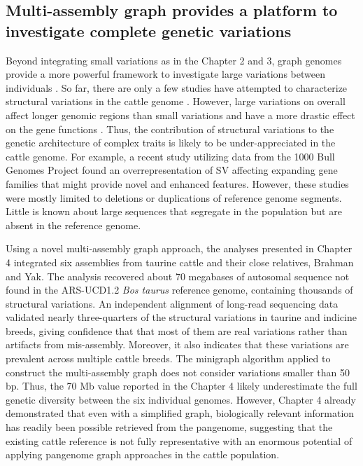 \documentclass[../main.tex]{subfiles}
\begin{document}
\subsection*{Multi-assembly graph provides a platform to investigate complete genetic variations }

Beyond integrating small variations as in the Chapter 2 and 3, graph genomes provide a more powerful framework to investigate large variations between individuals \citep{eggertsson2019graphtyper2,chen2019paragraph,siren2020genotyping}. So far, there are only a few studies have attempted to characterize structural variations in the cattle genome \citep{liu2010analysis,bickhart2012copy,boussaha2015genome,chen2017detection,Hu2020}. However, large variations on overall affect longer genomic regions than small variations and have a more drastic effect on the gene functions \citep{chiang2017impact,scott2021structural}. Thus, the contribution of structural variations to the genetic architecture of complex traits is likely to be under-appreciated in the cattle genome.
For example, a recent study utilizing data from the 1000 Bull Genomes Project \citep{chen2017detection} found an overrepresentation of SV affecting expanding gene families that might provide novel and enhanced features. However, these studies were mostly limited to deletions or duplications of reference genome segments. Little is known about large sequences that segregate in the population but are absent in the reference genome. 


Using a novel multi-assembly graph approach, the analyses presented in Chapter 4 integrated six assemblies from taurine cattle and their close relatives, Brahman and Yak. The analysis recovered about 70 megabases of autosomal sequence not found in the ARS-UCD1.2 \emph{Bos taurus} reference genome, containing thousands of structural variations. An independent alignment of long-read sequencing data validated nearly three-quarters of the structural variations in taurine and indicine breeds, giving confidence that that most of them are real variations rather than artifacts from mis-assembly. Moreover, it also indicates that these variations are prevalent across multiple cattle breeds. The minigraph algorithm applied to construct the multi-assembly graph does not consider variations smaller than 50 bp. Thus, the 70 Mb value reported in the Chapter 4 likely underestimate the full genetic diversity between the six individual genomes. However, Chapter 4 already demonstrated that even with a simplified graph, biologically relevant information has readily been possible retrieved from the pangenome, suggesting that the existing cattle reference is not fully representative with an enormous potential of applying pangenome graph approaches in the cattle population. 
\end{document}
